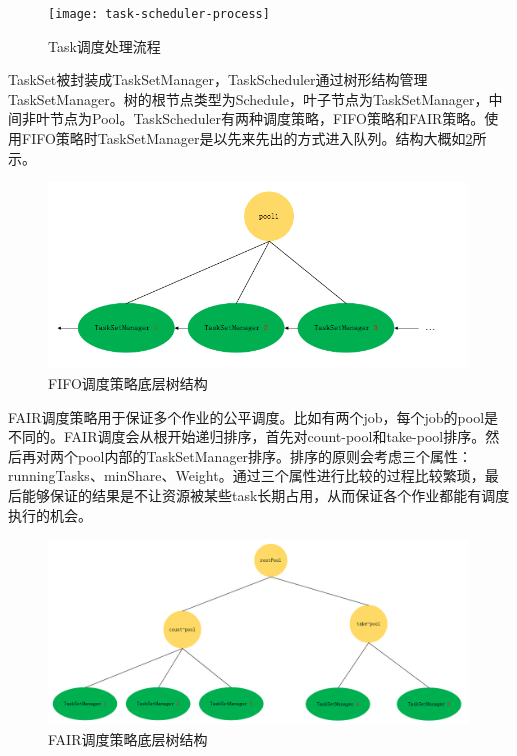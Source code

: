 \begin{figure}
    \centering
    \texttt{[image: task-scheduler-process]}
    \caption{Task调度处理流程}
    \label{fig:task-scheduler-process}
\end{figure}

TaskSet被封装成TaskSetManager，TaskScheduler通过树形结构管理TaskSetManager。树的根节点类型为Schedule，叶子节点为TaskSetManager，中间非叶节点为Pool。TaskScheduler有两种调度策略，FIFO策略和FAIR策略。使用FIFO策略时TaskSetManager是以先来先出的方式进入队列。结构大概如\ref{fig:scheduler-fifo-tree}所示。

\begin{figure}
    \centering
    \includegraphics[width=0.99\textwidth]{Img/spark-scheduler-fifo-tree.png}
    \caption{FIFO调度策略底层树结构}
    \label{fig:scheduler-fifo-tree}
\end{figure}

FAIR调度策略用于保证多个作业的公平调度。比如有两个job，每个job的pool是不同的。FAIR调度会从根开始递归排序，首先对count-pool和take-pool排序。然后再对两个pool内部的TaskSetManager排序。排序的原则会考虑三个属性：runningTasks、minShare、Weight。通过三个属性进行比较的过程比较繁琐，最后能够保证的结果是不让资源被某些task长期占用，从而保证各个作业都能有调度执行的机会。

\begin{figure}
    \centering
    \includegraphics[width=0.99\textwidth]{Img/scheduler-fair-tree.png}
    \caption{FAIR调度策略底层树结构}
    \label{fig:scheduler-fair-tree}
\end{figure}


